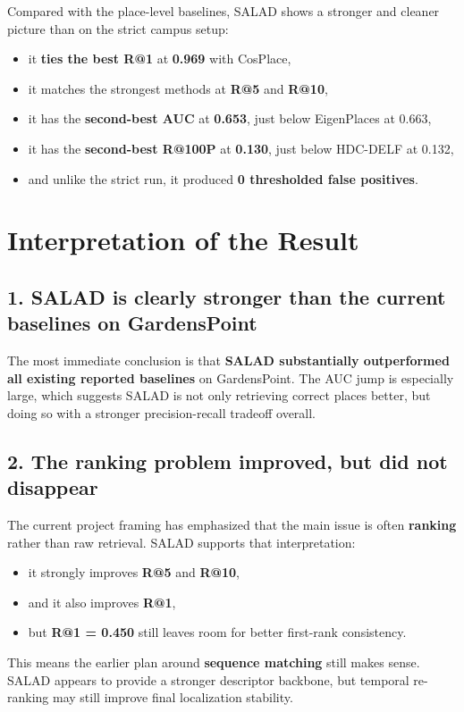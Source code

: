 \documentclass[11pt]{article}
\begin{document}
Compared with the place-level baselines, SALAD shows a stronger and cleaner picture than on the strict campus setup:
\begin{itemize}[leftmargin=*]
  \item it \textbf{ties the best R@1} at \textbf{0.969} with CosPlace,
  \item it matches the strongest methods at \textbf{R@5} and \textbf{R@10},
  \item it has the \textbf{second-best AUC} at \textbf{0.653}, just below EigenPlaces at 0.663,
  \item it has the \textbf{second-best R@100P} at \textbf{0.130}, just below HDC-DELF at 0.132,
  \item and unlike the strict run, it produced \textbf{0 thresholded false positives}.
\end{itemize}

\section*{Interpretation of the Result}
\subsection*{1. SALAD is clearly stronger than the current baselines on GardensPoint}
The most immediate conclusion is that \textbf{SALAD substantially outperformed all existing reported baselines} on GardensPoint. The AUC jump is especially large, which suggests SALAD is not only retrieving correct places better, but doing so with a stronger precision-recall tradeoff overall.

\subsection*{2. The ranking problem improved, but did not disappear}
The current project framing has emphasized that the main issue is often \textbf{ranking} rather than raw retrieval. SALAD supports that interpretation:
\begin{itemize}[leftmargin=*]
  \item it strongly improves \textbf{R@5} and \textbf{R@10},
  \item and it also improves \textbf{R@1},
  \item but \textbf{R@1 = 0.450} still leaves room for better first-rank consistency.
\end{itemize}

This means the earlier plan around \textbf{sequence matching} still makes sense. SALAD appears to provide a stronger descriptor backbone, but temporal re-ranking may still improve final localization stability.
\end{document}
